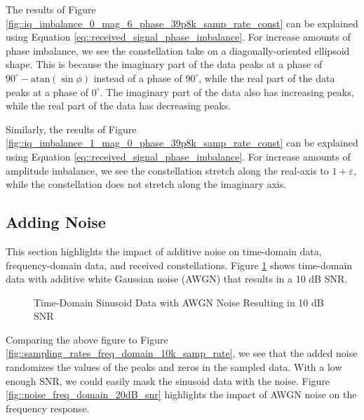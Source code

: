 \documentclass{article}
\begin{document}
The results of Figure \ref{fig::iq_imbalance_0_mag_6_phase_39p8k_samp_rate_const} can be explained using Equation \ref{eq::received_signal_phase_imbalance}. For increase amounts of phase imbalance, we see the constellation take on a diagonally-oriented ellipsoid shape. This is because the imaginary part of the data peaks at a phase of $90^{\circ} - \text{atan}(\sin\phi)$ instead of a phase of $90^{\circ}$, while the real part of the data peaks at a phase of $0^{\circ}$. The imaginary part of the data also has increasing peaks, while the real part of the data has decreasing peaks.

Similarly, the results of Figure \ref{fig::iq_imbalance_1_mag_0_phase_39p8k_samp_rate_const} can be explained using Equation \ref{eq::received_signal_phase_imbalance}. For increase amounts of amplitude imbalance, we see the constellation stretch along the real-axis to $1+\varepsilon$, while the constellation does not stretch along the imaginary axis.

\subsection{Adding Noise}

This section highlights the impact of additive noise on time-domain data, frequency-domain data, and received constellations. Figure \ref{fig::noise_time_domain_10dB_snr} shows time-domain data with additive white Gaussian noise (AWGN) that results in a 10 dB SNR.

\begin{figure}[H]
	\centerline{}
	\caption{Time-Domain Sinusoid Data with AWGN Noise Resulting in 10 dB SNR}
	\label{fig::noise_time_domain_10dB_snr}
\end{figure}

Comparing the above figure to Figure \ref{fig::sampling_rates_freq_domain_10k_samp_rate}, we see that the added noise randomizes the values of the peaks and zeros in the sampled data. With a low enough SNR, we could easily mask the sinusoid data with the noise. Figure \ref{fig::noise_freq_domain_20dB_snr} highlights the impact of AWGN noise on the frequency response.
\end{document}
